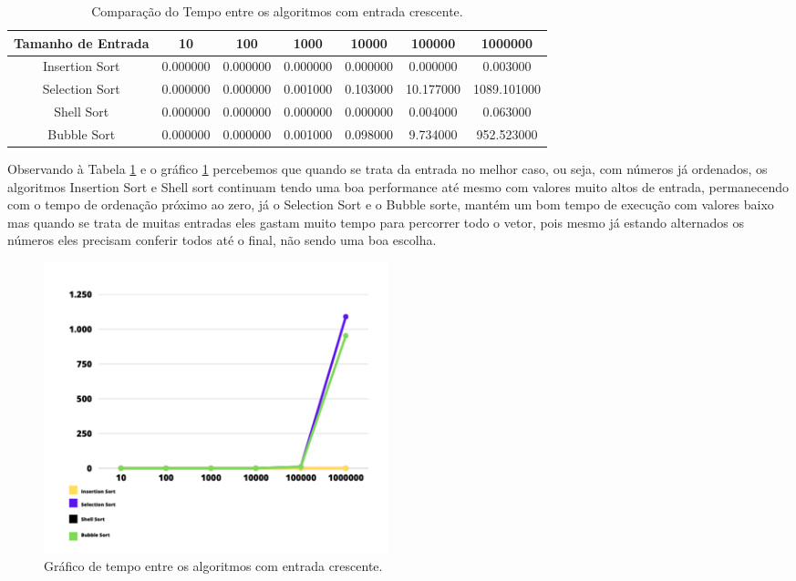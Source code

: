 \begin{table}[h]
    \centering
    \caption{Comparação do Tempo entre os algoritmos com entrada crescente.}
    \begin{tabular}{|c|c|c|c|c|c|c|}
        \hline
        Tamanho de Entrada & 10 & 100 & 1000 & 10000 & 100000 & 1000000 \\
        \hline
        Insertion Sort & 0.000000 & 0.000000 & 0.000000 & 0.000000 & 0.000000 & 0.003000 \\
        \hline
        Selection Sort & 0.000000 & 0.000000 & 0.001000 & 0.103000 & 10.177000 & 1089.101000 \\
        \hline
        Shell Sort & 0.000000 & 0.000000 & 0.000000 & 0.000000 & 0.004000 & 0.063000 \\
        \hline
        Bubble Sort & 0.000000 & 0.000000 & 0.001000 & 0.098000 & 9.734000 & 952.523000 \\
        \hline
    \end{tabular}
    \label{tab:comparacaogeral}
\end{table}

Observando à Tabela \ref{tab:comparacaogeral} e o gráfico \ref{fig:geral1} percebemos que quando se trata da entrada no melhor caso, ou seja, com números já ordenados, os algoritmos Insertion Sort e Shell sort continuam tendo uma boa performance até mesmo com valores muito altos de entrada, permanecendo com o tempo de ordenação próximo ao zero, já o Selection Sort e o Bubble sorte, mantém um bom tempo de execução com valores baixo mas quando se trata de muitas entradas eles gastam muito tempo para percorrer todo o vetor, pois mesmo já estando alternados os números eles precisam conferir todos até o final, não sendo uma boa escolha.

\begin{figure}[h!]
    \centering
    \includegraphics[width = 10cm]{Imagens/Geral/geral2.png}
    \caption{Gráfico de tempo entre os algoritmos com entrada crescente.}
    \label{fig:geral1}
\end{figure}
\newpage

